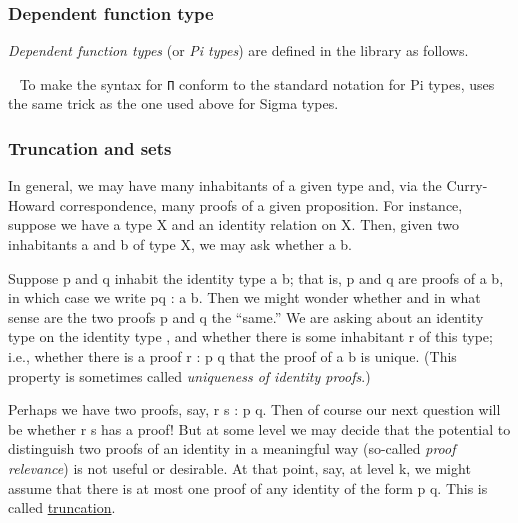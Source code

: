 \subsubsection{Dependent function type}\label{dependent-function-type}

\emph{Dependent function types} (or \emph{Pi types}) are defined in the \typetopology library as follows.
\ccpad

~\ccpad
To make the syntax for \texttt{Π} conform to the standard notation for Pi types, \mhe uses the same trick as the one used above for Sigma types.
\ccpad


\subsubsection{Truncation and sets}\label{truncation}
In general, we may have many inhabitants of a given type and, via the Curry-Howard correspondence, many proofs of a given proposition. For instance, suppose we have a type \ab X and an identity relation  on \ab X. Then, given two inhabitants \ab a and \ab b of type \ab X, we may ask whether \ab a  \ab b.

Suppose \ab p and \ab q inhabit the identity type \ab a  b; that is, \ab p and \ab q are proofs of \ab a  \ab b, in which case we write \ab p\ab q : \ab a  \ab b. Then we might wonder whether and in what sense are the two proofs \ab p and \ab q the ``same.'' We are asking about an identity type on the identity type , and whether there is some inhabitant \ab r of this type; i.e., whether there is a proof \ab r : \ab p  \ab q that the proof of \ab a  \ab b is unique. (This property is sometimes called \emph{uniqueness of identity proofs}.)

Perhaps we have two proofs, say, \ab r \ab s : \ab p  \ab q. Then of course our next question will be whether \ab r  \ab s has a proof!  But at some level we may decide that the potential to distinguish two proofs of an identity in a meaningful way (so-called \emph{proof relevance}) is not useful or desirable. At that point, say, at level \ab k, we might assume that there is at most one proof of any identity of the form \ab p   \ab q. This is called \href{https://www.cs.bham.ac.uk/~mhe/HoTT-UF-in-Agda-Lecture-Notes/HoTT-UF-Agda.html#truncation}{truncation}.

